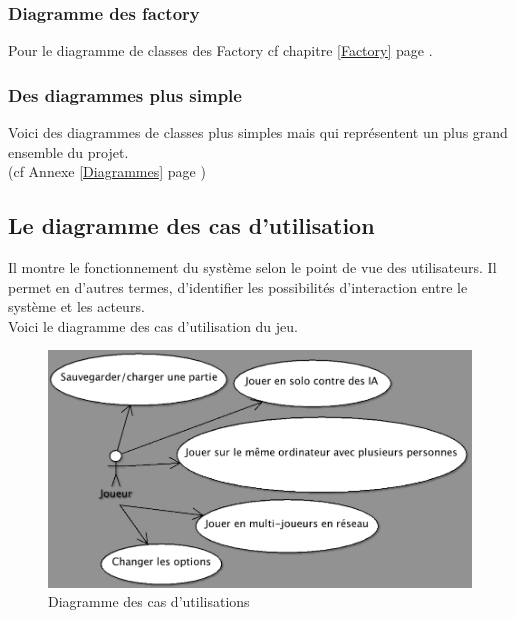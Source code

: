 \documentclass{report}
\begin{document}
\subsubsection{Diagramme des factory}
Pour le diagramme de classes des Factory cf chapitre \ref{Factory} page \pageref{Factory}.
\subsubsection{Des diagrammes plus simple}
Voici des diagrammes de classes plus simples mais qui représentent un plus grand ensemble du projet.\\
(cf Annexe \ref{Diagrammes} page \pageref{Diagrammes})

\subsection{Le diagramme des cas d'utilisation}
Il  montre  le  fonctionnement  du  système  selon  le  point  de  vue  des utilisateurs.  Il  permet  en  d’autres  termes,  d'identifier  les  possibilités d'interaction  entre  le  système  et  les  acteurs.\\
Voici  le  diagramme  des  cas d’utilisation du jeu.
\begin{figure}[H]
\center
\includegraphics[width=500pt]{casUtilisation.png}
\caption{Diagramme des cas d'utilisations}
\label{Diagramme des cas d'utilisations}
\end{figure}
\newpage
\end{document}
